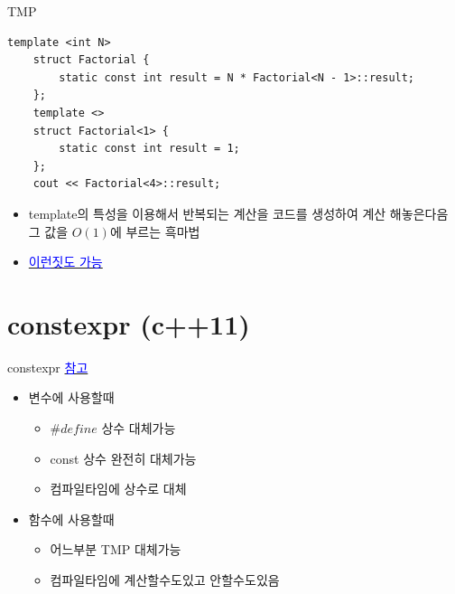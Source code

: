 \documentclass[10pt]{beamer}
\begin{document}
\begin{frame}[fragile]{TMP}
    
    \begin{lstlisting}[style = CppStyle]
    template <int N>
    struct Factorial {
        static const int result = N * Factorial<N - 1>::result;
    };
    template <>
    struct Factorial<1> {
        static const int result = 1;
    };
    cout << Factorial<4>::result; 
    \end{lstlisting}
    
    \begin{itemize}
        \item template의 특성을 이용해서 반복되는 계산을 코드를 생성하여 계산 해놓은다음 그 값을 $O(1)$에 부르는 흑마법
        \item \href{https://libsora.so/posts/friday-the-13th-tmp/}{\textcolor{blue}{이런짓도 가능}}
    \end{itemize}
\end{frame}    


\section{constexpr (c++11)}

\begin{frame}[fragile]{constexpr}
    \href{https://youtu.be/o9FXctFYlnY}{\textcolor{blue}{참고}}
    \begin{itemize}
        \item 변수에 사용할때
        \begin{itemize}
            \item $\#define$ 상수 대체가능
            \item const 상수 완전히 대체가능
            \item 컴파일타임에 상수로 대체
        \end{itemize}
        \item 함수에 사용할때
        \begin{itemize}
            \item 어느부분 TMP 대체가능
            \item 컴파일타임에 계산할수도있고 안할수도있음
        \end{itemize}
    \end{itemize}
\end{frame} 
\end{document}
